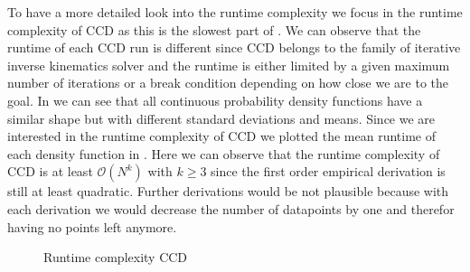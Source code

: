 To have a more detailed look into the runtime complexity we focus in the runtime complexity of CCD as this is the slowest part of . We can observe that the runtime of each CCD run is different since CCD belongs to the family of iterative inverse kinematics solver and the runtime is either limited by a given maximum number of iterations or a break condition depending on how close we are to the goal. 
In  we can see that all continuous probability density functions have a similar shape but with different standard deviations and means. Since we are interested in the runtime complexity of CCD we plotted the mean runtime of each density function in . Here we can observe that the runtime complexity of CCD is at least $\mathcal{O}(N^k)$ with $k \geq 3$ since the first order empirical derivation is still at least quadratic. Further derivations would be not plausible because with each derivation we would decrease the number of datapoints by one and therefor having no points left anymore.
\begin{figure}
    \begin{center}
        \hfill
    \end{center}
    \caption[Runtime complexity CCD]{Runtime complexity CCD}
    \label{fig:expert_dataset}
\end{figure}

